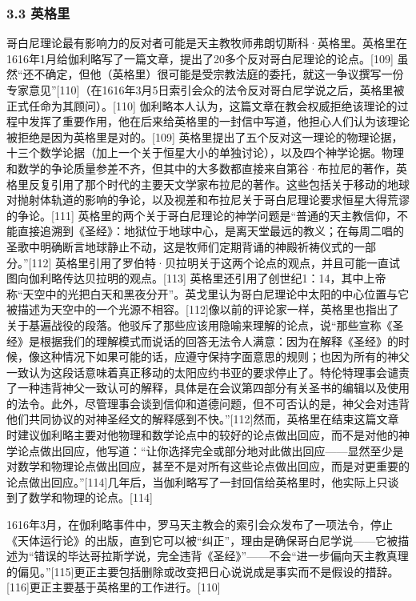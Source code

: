 \subsubsection{3.3 英格里}
哥白尼理论最有影响力的反对者可能是天主教牧师弗朗切斯科·英格里。英格里在1616年1月给伽利略写了一篇文章，提出了20多个反对哥白尼理论的论点。[109] 虽然“还不确定，但他（英格里）很可能是受宗教法庭的委托，就这一争议撰写一份专家意见”[110]（在1616年3月5日索引会众的法令反对哥白尼学说之后，英格里被正式任命为其顾问）。[110] 伽利略本人认为，这篇文章在教会权威拒绝该理论的过程中发挥了重要作用，他在后来给英格里的一封信中写道，他担心人们认为该理论被拒绝是因为英格里是对的。[109] 英格里提出了五个反对这一理论的物理论据，十三个数学论据（加上一个关于恒星大小的单独讨论），以及四个神学论据。物理和数学的争论质量参差不齐，但其中的大多数都直接来自第谷·布拉尼的著作，英格里反复引用了那个时代的主要天文学家布拉尼的著作。这些包括关于移动的地球对抛射体轨道的影响的争论，以及视差和布拉尼关于哥白尼理论要求恒星大得荒谬的争论。[111] 英格里的两个关于哥白尼理论的神学问题是“普通的天主教信仰，不能直接追溯到《圣经》：地狱位于地球中心，是离天堂最远的教义；在每周二唱的圣歌中明确断言地球静止不动，这是牧师们定期背诵的神殿祈祷仪式的一部分。”[112] 英格里引用了罗伯特·贝拉明关于这两个论点的观点，并且可能一直试图向伽利略传达贝拉明的观点。[113] 英格里还引用了创世纪1：14，其中上帝称“天空中的光把白天和黑夜分开”。英戈里认为哥白尼理论中太阳的中心位置与它被描述为天空中的一个光源不相容。[112]像以前的评论家一样，英格里也指出了关于基遍战役的段落。他驳斥了那些应该用隐喻来理解的论点，说“那些宣称《圣经》是根据我们的理解模式而说话的回答无法令人满意：因为在解释《圣经》的时候，像这种情况下如果可能的话，应遵守保持字面意思的规则；也因为所有的神父一致认为这段话意味着真正移动的太阳应约书亚的要求停止了。特伦特理事会谴责了一种违背神父一致认可的解释，具体是在会议第四部分有关圣书的编辑以及使用的法令。此外，尽管理事会谈到信仰和道德问题，但不可否认的是，神父会对违背他们共同协议的对神圣经文的解释感到不快。”[112]然而，英格里在结束这篇文章时建议伽利略主要对他物理和数学论点中的较好的论点做出回应，而不是对他的神学论点做出回应，他写道：“让你选择完全或部分地对此做出回应——显然至少是对数学和物理论点做出回应，甚至不是对所有这些论点做出回应，而是对更重要的论点做出回应。”[114]几年后，当伽利略写了一封回信给英格里时，他实际上只谈到了数学和物理的论点。[114]

1616年3月，在伽利略事件中，罗马天主教会的索引会众发布了一项法令，停止《天体运行论》的出版，直到它可以被“纠正”，理由是确保哥白尼学说——它被描述为“错误的毕达哥拉斯学说，完全违背《圣经》”——不会“进一步偏向天主教真理的偏见。”[115]更正主要包括删除或改变把日心说说成是事实而不是假设的措辞。[116]更正主要基于英格里的工作进行。[110]

